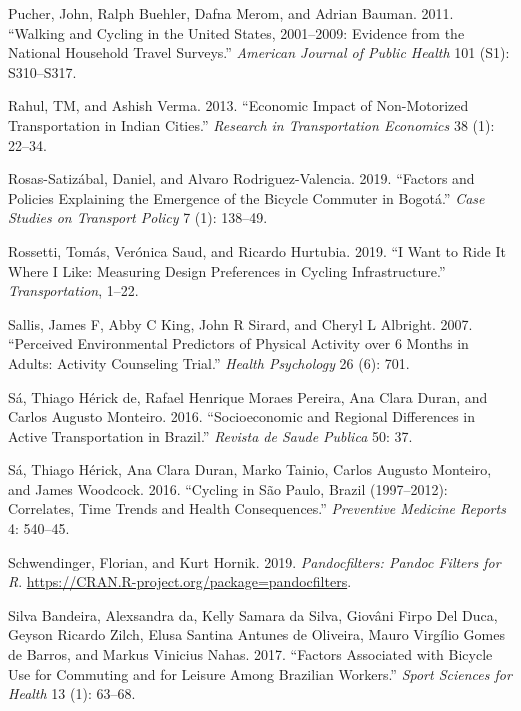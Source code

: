 \documentclass[]{elsarticle} %
\begin{document}
\leavevmode\hypertarget{ref-pucher2011walking}{}%
Pucher, John, Ralph Buehler, Dafna Merom, and Adrian Bauman. 2011.
``Walking and Cycling in the United States, 2001--2009: Evidence from
the National Household Travel Surveys.'' \emph{American Journal of
Public Health} 101 (S1): S310--S317.

\leavevmode\hypertarget{ref-rahul2013economic}{}%
Rahul, TM, and Ashish Verma. 2013. ``Economic Impact of Non-Motorized
Transportation in Indian Cities.'' \emph{Research in Transportation
Economics} 38 (1): 22--34.

\leavevmode\hypertarget{ref-rosas2019factors}{}%
Rosas-Satizábal, Daniel, and Alvaro Rodriguez-Valencia. 2019. ``Factors
and Policies Explaining the Emergence of the Bicycle Commuter in
Bogotá.'' \emph{Case Studies on Transport Policy} 7 (1): 138--49.

\leavevmode\hypertarget{ref-rossetti2019want}{}%
Rossetti, Tomás, Verónica Saud, and Ricardo Hurtubia. 2019. ``I Want to
Ride It Where I Like: Measuring Design Preferences in Cycling
Infrastructure.'' \emph{Transportation}, 1--22.

\leavevmode\hypertarget{ref-sallis2007perceived}{}%
Sallis, James F, Abby C King, John R Sirard, and Cheryl L Albright.
2007. ``Perceived Environmental Predictors of Physical Activity over 6
Months in Adults: Activity Counseling Trial.'' \emph{Health Psychology}
26 (6): 701.

\leavevmode\hypertarget{ref-sa2016socioeconomic}{}%
Sá, Thiago Hérick de, Rafael Henrique Moraes Pereira, Ana Clara Duran,
and Carlos Augusto Monteiro. 2016. ``Socioeconomic and Regional
Differences in Active Transportation in Brazil.'' \emph{Revista de Saude
Publica} 50: 37.

\leavevmode\hypertarget{ref-sa2016cycling}{}%
Sá, Thiago Hérick, Ana Clara Duran, Marko Tainio, Carlos Augusto
Monteiro, and James Woodcock. 2016. ``Cycling in São Paulo, Brazil
(1997--2012): Correlates, Time Trends and Health Consequences.''
\emph{Preventive Medicine Reports} 4: 540--45.

\leavevmode\hypertarget{ref-Schwendinger2019pandocfilters}{}%
Schwendinger, Florian, and Kurt Hornik. 2019. \emph{Pandocfilters:
Pandoc Filters for R}.
\url{https://CRAN.R-project.org/package=pandocfilters}.

\leavevmode\hypertarget{ref-da2017factors}{}%
Silva Bandeira, Alexsandra da, Kelly Samara da Silva, Giovâni Firpo Del
Duca, Geyson Ricardo Zilch, Elusa Santina Antunes de Oliveira, Mauro
Virgílio Gomes de Barros, and Markus Vinicius Nahas. 2017. ``Factors
Associated with Bicycle Use for Commuting and for Leisure Among
Brazilian Workers.'' \emph{Sport Sciences for Health} 13 (1): 63--68.
\end{document}
